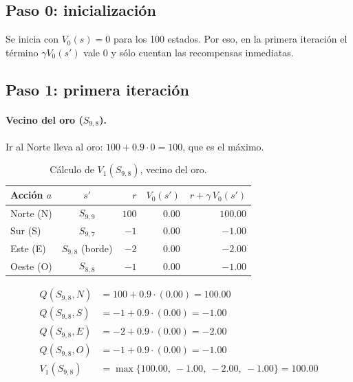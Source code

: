 \documentclass[11pt,letterpaper]{article}
\begin{document}
\subsection{Paso 0: inicialización}
Se inicia con $V_0(s) = 0$ para los 100 estados. Por eso, en la primera iteración el término $\gamma V_0(s')$ vale 0 y sólo cuentan las recompensas inmediatas.

\subsection{Paso 1: primera iteración}
\paragraph{Vecino del oro ($S_{9,8}$).} Ir al Norte lleva al oro: $100 + 0.9\cdot 0 = 100$, que es el máximo.
\begin{table}[H]
\centering
\small
\caption{Cálculo de $V_1(S_{9,8})$, vecino del oro.}
\label{tab:it1-oro}
\begin{tabular}{lcrrr}
\toprule
Acción $a$ & $s'$ & $r$ & $V_{0}(s')$ & $r + \gamma\,V_{0}(s')$ \\
\midrule
Norte (N) & $S_{9,9}$ & $100$ & $0.00$ & $\mathbf{100.00}$ \\
Sur (S) & $S_{9,7}$ & $-1$ & $0.00$ & $-1.00$ \\
Este (E) & $S_{9,8}$ (borde) & $-2$ & $0.00$ & $-2.00$ \\
Oeste (O) & $S_{8,8}$ & $-1$ & $0.00$ & $-1.00$ \\
\bottomrule
\end{tabular}
\end{table}
\begin{align*}
Q(S_{9,8},N) &= 100 + 0.9\cdot(0.00) = 100.00 \\
Q(S_{9,8},S) &= -1 + 0.9\cdot(0.00) = -1.00 \\
Q(S_{9,8},E) &= -2 + 0.9\cdot(0.00) = -2.00 \\
Q(S_{9,8},O) &= -1 + 0.9\cdot(0.00) = -1.00 \\
V_{1}(S_{9,8}) &= \max\{100.00,\ -1.00,\ -2.00,\ -1.00\} = \mathbf{100.00}
\end{align*}
\end{document}
